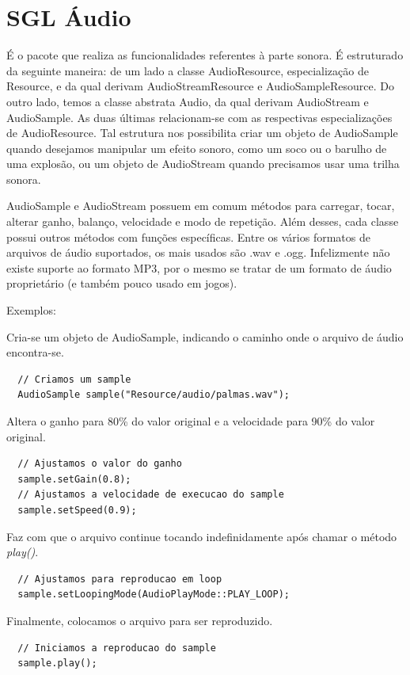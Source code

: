 \section{SGL Áudio}
%
%
É o pacote que realiza as funcionalidades referentes à parte sonora. É estruturado da seguinte maneira: de um lado a classe AudioResource, especialização de Resource, e da qual derivam AudioStreamResource e AudioSampleResource. Do outro lado, temos a classe abstrata Audio, da qual derivam AudioStream e AudioSample. As duas últimas relacionam-se com as respectivas especializações de AudioResource. Tal estrutura nos possibilita criar um objeto de AudioSample quando desejamos manipular um efeito sonoro, como um soco ou o barulho de uma explosão, ou um objeto de AudioStream quando precisamos usar uma trilha sonora.
\par 
AudioSample e AudioStream possuem em comum métodos para carregar, tocar, alterar ganho, balanço, velocidade e modo de repetição. Além desses, cada classe possui outros métodos com funções específicas. Entre os vários formatos de arquivos de áudio suportados, os mais usados são .wav e .ogg. Infelizmente não existe suporte ao formato MP3, por o mesmo se tratar de um formato de áudio proprietário (e também pouco usado em jogos).
\par
Exemplos:
\par 
Cria-se um objeto de  AudioSample, indicando o caminho onde o arquivo de áudio encontra-se.
%
\begin{lstlisting}
  // Criamos um sample
  AudioSample sample("Resource/audio/palmas.wav");
\end{lstlisting}
%
\par
Altera o ganho para 80\% do valor original e a velocidade para 90\% do valor original.
%
\begin{lstlisting}
  // Ajustamos o valor do ganho
  sample.setGain(0.8);
  // Ajustamos a velocidade de execucao do sample
  sample.setSpeed(0.9);
\end{lstlisting}
%
\par
Faz com que o arquivo continue tocando indefinidamente após chamar o método \textit{play()}.
%
\begin{lstlisting}
  // Ajustamos para reproducao em loop
  sample.setLoopingMode(AudioPlayMode::PLAY_LOOP);
\end{lstlisting}
%
\par
Finalmente, colocamos o arquivo para ser reproduzido.
%
\begin{lstlisting}
  // Iniciamos a reproducao do sample
  sample.play();
\end{lstlisting}
